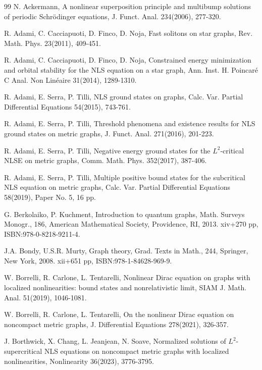\documentclass[11pt]{amsart}
\numberwithin{equation}{section}
\begin{document}
  \begin{thebibliography}{99}
N. Ackermann, A nonlinear superposition principle and multibump solutions of periodic Schr\"odinger equations, J. Funct. Anal. 234(2006), 277-320.

R. Adami, C. Cacciapuoti, D. Finco, D. Noja, Fast solitons on star graphs, Rev. Math. Phys. 23(2011), 409-451.

R. Adami, C. Cacciapuoti, D. Finco, D. Noja, Constrained energy minimization and orbital stability for the NLS equation on a star graph,
Ann. Inst. H. Poincar\'{e} C Anal. Non Lin\'{e}aire 31(2014), 1289-1310.

R. Adami, E. Serra, P. Tilli, NLS ground states on graphs, Calc. Var. Partial Differential Equations 54(2015), 743-761.

R. Adami, E. Serra, P. Tilli, Threshold phenomena and existence results for NLS ground states on metric graphs, J. Funct. Anal. 271(2016), 201-223.

R. Adami, E. Serra, P. Tilli, Negative energy ground states for the $L^2$-critical NLSE on metric graphs, Comm. Math. Phys. 352(2017), 387-406.

R. Adami, E. Serra, P. Tilli, Multiple positive bound states for the subcritical NLS equation on metric graphs, Calc. Var. Partial Differential Equations 58(2019), Paper No. 5, 16 pp.

G. Berkolaiko, P. Kuchment, Introduction to quantum graphs, Math. Surveys Monogr., 186, American Mathematical Society, Providence, RI, 2013. xiv+270 pp, ISBN:978-0-8218-9211-4.

J.A. Bondy, U.S.R. Murty, Graph theory, Grad. Texts in Math., 244, Springer, New York, 2008. xii+651 pp, ISBN:978-1-84628-969-9.

W. Borrelli, R. Carlone, L. Tentarelli, Nonlinear Dirac equation on graphs with localized nonlinearities: bound states and nonrelativistic limit, SIAM J. Math. Anal. 51(2019), 1046-1081.

W. Borrelli, R. Carlone, L. Tentarelli, On the nonlinear Dirac equation on noncompact metric graphs, J. Differential Equations 278(2021), 326-357.

J. Borthwick, X. Chang, L. Jeanjean, N. Soave, Normalized solutions of $L^2$-supercritical NLS equations on noncompact metric graphs with localized nonlinearities, Nonlinearity 36(2023), 3776-3795.



\end{thebibliography}
\end{document}
